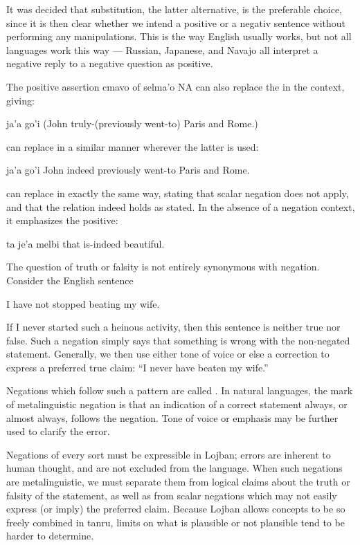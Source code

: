 It was decided that substitution, the latter alternative, is
    the preferable choice, since it is then clear whether we intend
    a positive or a negativ sentence without performing any
    manipulations. This is the way English usually works, but not
    all languages work this way --- Russian, Japanese, and Navajo
    all interpret a negative reply to a negative question as
    positive.

The positive assertion cmavo of selma'o NA can also replace
    the  in the context, giving:
\begin{example}
ja'a go'i\n
(John truly-(previously went-to)  Paris and Rome.)
\end{example}

 can replace  in a similar manner wherever the
    latter is used:
\begin{example}
ja'a go'i\n
John indeed previously went-to  Paris and Rome.
\end{example}

 can replace  in exactly the same way, stating
    that scalar negation does not apply, and that the relation
    indeed holds as stated. In the absence of a negation context,
    it emphasizes the positive:
\begin{example}
ta je'a melbi\n
that is-indeed beautiful.
\end{example}



The question of truth or falsity is not entirely synonymous
    with negation. Consider the English sentence
\begin{example}
I have not stopped beating my wife.
\end{example}

If I never started such a heinous activity, then this
    sentence is neither true nor false. Such a negation simply says
    that something is wrong with the non-negated statement.
    Generally, we then use either tone of voice or else a
    correction to express a preferred true claim: ``I never have
    beaten my wife.''

Negations which follow such a pattern are called
    . In natural languages, the mark of
    metalinguistic negation is that an indication of a correct
    statement always, or almost always, follows the negation. Tone
    of voice or emphasis may be further used to clarify the
    error.

Negations of every sort must be expressible in Lojban;
    errors are inherent to human thought, and are not excluded from
    the language. When such negations are metalinguistic, we must
    separate them from logical claims about the truth or falsity of
    the statement, as well as from scalar negations which may not
    easily express (or imply) the preferred claim. Because Lojban
    allows concepts to be so freely combined in tanru, limits on
    what is plausible or not plausible tend to be harder to
    determine.

